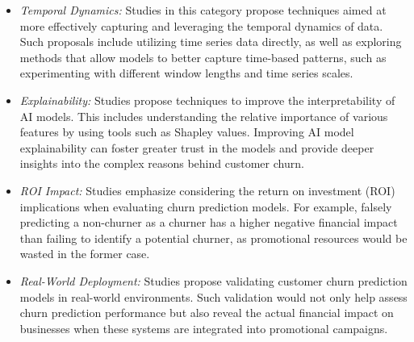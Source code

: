 \documentclass[preprint,12pt]{elsarticle}
\begin{document}
\begin{itemize}
    \item \textit{Temporal Dynamics:} Studies in this category propose techniques aimed at more effectively capturing and leveraging the temporal dynamics of data. Such proposals include utilizing time series data directly, as well as exploring methods that allow models to better capture time-based patterns, such as experimenting with different window lengths and time series scales.
    

    \item \textit{Explainability:} Studies propose techniques to improve the interpretability of AI models. This includes understanding the relative importance of various features by using tools such as Shapley values. Improving AI model explainability can foster greater trust in the models and provide deeper insights into the complex reasons behind customer churn.

    \item \textit{ROI Impact:} Studies emphasize considering the return on investment (ROI) implications when evaluating churn prediction models. For example, falsely predicting a non-churner as a churner has a higher negative financial impact than failing to identify a potential churner, as promotional resources would be wasted in the former case.
    
    \item \textit{Real-World Deployment:} Studies propose validating customer churn prediction models in real-world environments. Such validation would not only help assess churn prediction performance but also reveal the actual financial impact on businesses when these systems are integrated into promotional campaigns.
    
\end{itemize}
\end{document}
